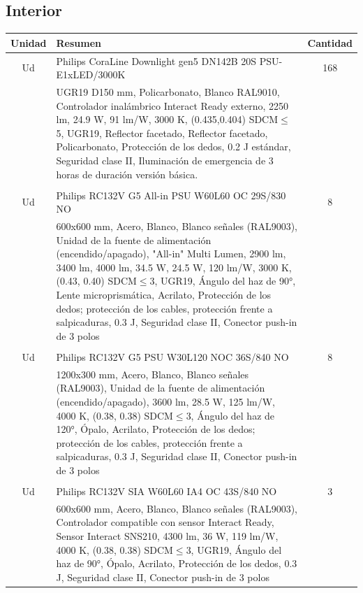 \documentclass[../main.tex]{subfiles}
\begin{document}
\subsection{Interior}
\begin{table}[H]
    \centering
    \begin{tabular}{c p{11.5cm} c}
        Unidad & Resumen & Cantidad  \\ \hline
        Ud & Philips CoraLine Downlight gen5 DN142B 20S PSU-E1xLED/3000K & 168 \\
        & UGR19 D150 mm, Policarbonato, Blanco RAL9010, Controlador inalámbrico Interact Ready externo, 2250 lm, 24.9 W, 91 lm/W, 3000 K, (0.435,0.404) SDCM$\leq$5, UGR19, Reflector facetado, Reflector facetado, Policarbonato, Protección de los dedos, 0.2 J estándar, Seguridad clase II, Iluminación de emergencia de 3 horas de duración versión básica. & \\
        \\
        Ud & Philips RC132V G5 All-in PSU W60L60 OC 29S/830 NO & 8 \\
        & 600x600 mm, Acero, Blanco, Blanco señales (RAL9003), Unidad de la fuente de alimentación (encendido/apagado), "All-in" Multi Lumen, 2900 lm, 3400 lm, 4000 lm, 34.5 W, 24.5 W, 120 lm/W, 3000 K, (0.43, 0.40) SDCM$\leq$3, UGR19, Ángulo del haz de 90°, Lente microprismática, Acrilato, Protección de los dedos; protección de los cables, protección frente a salpicaduras, 0.3 J, Seguridad clase II, Conector push-in de 3 polos &\\
        \\
        Ud & Philips RC132V G5 PSU W30L120 NOC 36S/840 NO & 8 \\
        & 1200x300 mm, Acero, Blanco, Blanco señales (RAL9003), Unidad de la fuente de alimentación (encendido/apagado), 3600 lm, 28.5 W, 125 lm/W, 4000 K, (0.38, 0.38) SDCM$\leq$3, Ángulo del haz de 120°, Ópalo, Acrilato, Protección de los dedos; protección de los cables, protección frente a salpicaduras, 0.3 J, Seguridad clase II, Conector push-in de 3 polos &\\
        \\
        Ud & Philips RC132V SIA W60L60 IA4 OC 43S/840 NO & 3 \\
        & 600x600 mm, Acero, Blanco, Blanco señales (RAL9003), Controlador compatible con sensor Interact Ready, Sensor Interact SNS210, 4300 lm, 36 W, 119 lm/W, 4000 K, (0.38, 0.38) SDCM$\leq$3, UGR19, Ángulo del haz de 90°, Ópalo, Acrilato, Protección de los dedos, 0.3 J, Seguridad clase II, Conector push-in de 3 polos &\\

\end{tabular}
\end{table}
\end{document}
